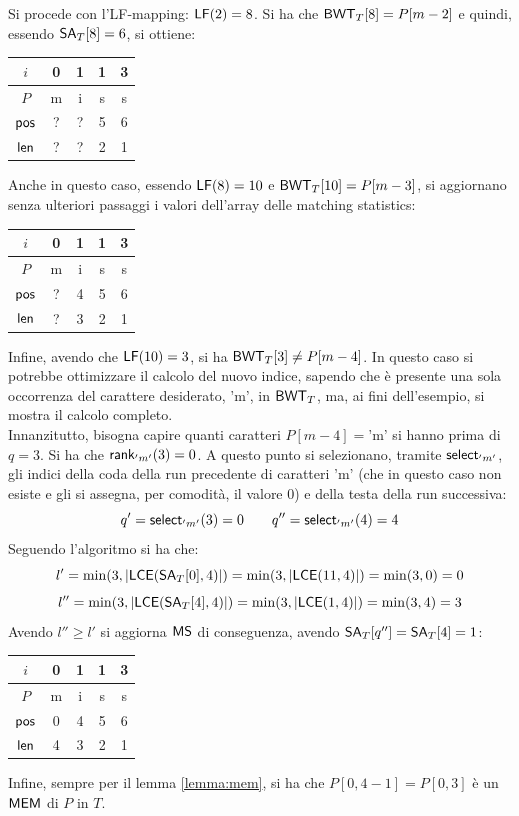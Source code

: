 \begin{esempio}
  Si procede con l'LF-mapping: $\mbox{\rm {\sf LF}}(2)=8$. Si ha che
  $\mbox{\rm {\sf BWT}}_T[8]=P[m-2]$ e quindi, essendo $\mbox{\rm {\sf SA}}_T[8]=6$, si ottiene:
  \begin{table}[H]
    \centering
    \begin{tabular}{c||c|c|c|c}
      $i$ & 0 & 1 & 1 & 3 \\
      \hline
      $P$ & m & i & s & s \\
      \hline
      \hline
      $\mbox{\rm {\sf pos}}$ & ? & ? & 5 & 6\\
      \hline
      $\mbox{\rm {\sf len}}$& ? & ? & 2 & 1\\
    \end{tabular}
  \end{table}
  Anche in questo caso, essendo $\mbox{\rm {\sf LF}}(8)=10$ e $\mbox{\rm {\sf BWT}}_T[10]=P[m-3]$, si
  aggiornano senza ulteriori passaggi i valori dell'array delle matching
  statistics: 
  \begin{table}[H]
    \centering
    \begin{tabular}{c||c|c|c|c}
      $i$ & 0 & 1 & 1 & 3 \\
      \hline
      $P$ & m & i & s & s \\
      \hline
      \hline
      $\mbox{\rm {\sf pos}}$ & ? & 4 & 5 & 6\\
      \hline
      $\mbox{\rm {\sf len}}$ & ? & 3 & 2 & 1\\
    \end{tabular}
  \end{table}
  Infine, avendo che $\mbox{\rm {\sf LF}}(10)=3$, si ha $\mbox{\rm {\sf BWT}}_T[3]\neq P[m-4]$. In questo caso si
  potrebbe ottimizzare il calcolo del nuovo indice, sapendo che è presente una
  sola occorrenza del carattere desiderato, $\mbox{'m'}$, in $\mbox{\rm {\sf BWT}}_T$, ma, ai
  fini dell'esempio, si mostra il calcolo completo.\\
  Innanzitutto, bisogna capire
  quanti caratteri $P[m-4]=\mbox{'m'}$ si hanno prima di $q=3$. Si ha che
  $\mbox{\rm {\sf rank}}_{'m'}(3)=0$. A questo punto si selezionano, tramite $\mbox{\rm {\sf select}}_{'m'}$,
  gli indici della
  coda della run precedente di caratteri $\mbox{'m'}$ (che in questo caso non
  esiste e gli si assegna, per comodità, il valore 0) e della testa della run
  successiva:
  \[q'=\mbox{\rm {\sf select}}_{'m'}(3)=0\quad \quad q''=\mbox{\rm {\sf select}}_{'m'}(4)=4\]
  Seguendo l'algoritmo si ha che:
  \[l'=\min(3,\left|\mbox{\rm {\sf LCE}}(\mbox{\rm {\sf SA}}_T[0],4)\right|)=\min(3,\left|\mbox{\rm {\sf LCE}}(11,4)\right|)
    =\min(3,0)=0\]
  \[l''=\min(3,\left|\mbox{\rm {\sf LCE}}(\mbox{\rm {\sf SA}}_T[4],4)\right|)=\min(3,\left|\mbox{\rm {\sf LCE}}(1,4)\right|)
    =\min(3,4)=3\]
  Avendo $l''\geq l'$ si aggiorna $\mbox{\rm {\sf MS}}$ di conseguenza, avendo
  $\mbox{\rm {\sf SA}}_T[q'']=\mbox{\rm {\sf SA}}_T[4]=1$: 
  \begin{table}[H]
    \centering
    \begin{tabular}{c||c|c|c|c}
      $i$ & 0 & 1 & 1 & 3 \\
      \hline
      $P$ & m & i & s & s \\
      \hline
      \hline
      $\mbox{\rm {\sf pos}}$ & 0 & 4 & 5 & 6\\
      \hline
      $\mbox{\rm {\sf len}}$ & 4 & 3 & 2 & 1\\
    \end{tabular}
  \end{table}
  \noindent
  Infine, sempre per il lemma \ref{lemma:mem}, si ha che $P[0,4-1]=P[0,3]$ è
  un $\mbox{\rm {\sf MEM}}$ di $P$ in $T$. 
\end{esempio}
